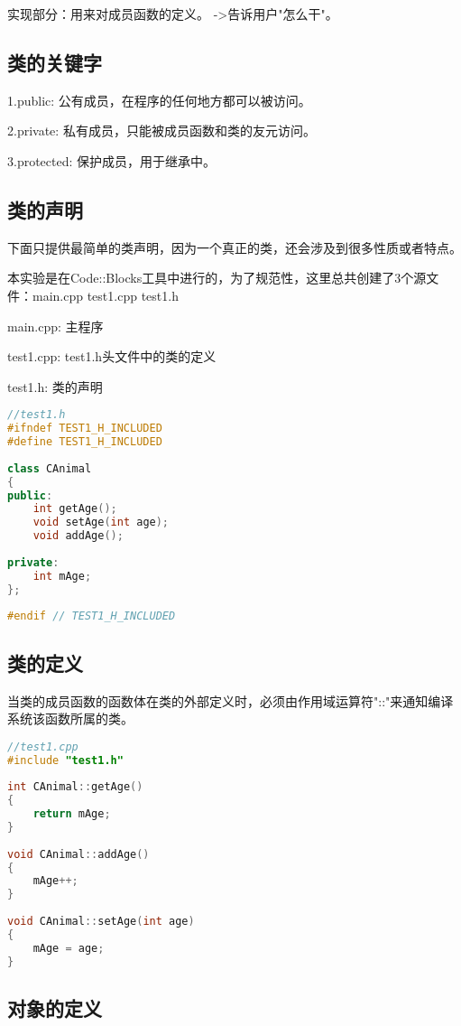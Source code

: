 \documentclass{article}
\begin{document}
实现部分：用来对成员函数的定义。 ->告诉用户"怎么干"。
\subsection{类的关键字}
\label{sec-3-2}
1.public: 公有成员，在程序的任何地方都可以被访问。

2.private: 私有成员，只能被成员函数和类的友元访问。

3.protected: 保护成员，用于继承中。
\subsection{类的声明}
\label{sec-3-3}

下面只提供最简单的类声明，因为一个真正的类，还会涉及到很多性质或者特点。

本实验是在Code::Blocks工具中进行的，为了规范性，这里总共创建了3个源文件：main.cpp test1.cpp test1.h

main.cpp: 主程序

test1.cpp: test1.h头文件中的类的定义

test1.h: 类的声明

\begin{lstlisting}[language=c++]
//test1.h  
#ifndef TEST1_H_INCLUDED  
#define TEST1_H_INCLUDED  
  
class CAnimal  
{  
public:  
    int getAge();  
    void setAge(int age);  
    void addAge();  
  
private:  
    int mAge;  
};  
  
#endif // TEST1_H_INCLUDED  
\end{lstlisting}
\subsection{类的定义}
\label{sec-3-4}

当类的成员函数的函数体在类的外部定义时，必须由作用域运算符"::"来通知编译系统该函数所属的类。
\begin{lstlisting}[language=c++]
//test1.cpp  
#include "test1.h"  
  
int CAnimal::getAge()  
{  
    return mAge;  
}  
  
void CAnimal::addAge()  
{  
    mAge++;  
}  
  
void CAnimal::setAge(int age)  
{  
    mAge = age;  
}  
\end{lstlisting}
\subsection{对象的定义}
\label{sec-3-5}
\end{document}
